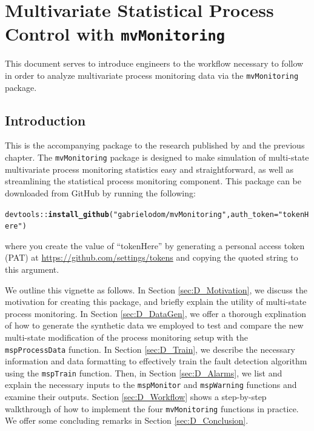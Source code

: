 \documentclass{report}\usepackage[]{graphicx}\usepackage[]{color}
\makeatletter
\newcommand{\hlstr}[1]{\textcolor[rgb]{0.192,0.494,0.8}{#1}}%
\newcommand{\hlopt}[1]{\textcolor[rgb]{0,0,0}{#1}}%
\newcommand{\hlstd}[1]{\textcolor[rgb]{0.345,0.345,0.345}{#1}}%
\newcommand{\hlkwc}[1]{\textcolor[rgb]{0.333,0.667,0.333}{#1}}%
\newcommand{\hlkwd}[1]{\textcolor[rgb]{0.737,0.353,0.396}{\textbf{#1}}}%
\newenvironment{kframe}{%
 \def\at@end@of@kframe{}%
 \ifinner\ifhmode%
  \def\at@end@of@kframe{\end{minipage}}%
  \begin{minipage}{\columnwidth}%
 \fi\fi%
 \def\FrameCommand##1{\hskip\@totalleftmargin \hskip-\fboxsep
 \colorbox{shadecolor}{##1}\hskip-\fboxsep
     \hskip-\linewidth \hskip-\@totalleftmargin \hskip\columnwidth}%
 \MakeFramed {\advance\hsize-\width
   \@totalleftmargin\z@ \linewidth\hsize
   \@setminipage}}%
 {\par\unskip\endMakeFramed%
 \at@end@of@kframe}
\newenvironment{knitrout}{}{} %
\makeatother
\begin{document}
\chapter{Multivariate Statistical Process Control with \texttt{mvMonitoring}}

This document serves to introduce engineers to the workflow necessary to follow in order to analyze multivariate process monitoring data via the \texttt{mvMonitoring} package.



\section{Introduction} \label{sec:intro}

This is the accompanying package to the research published by \cite{kazor_comparison_2016} and the previous chapter. The \texttt{mvMonitoring} package is designed to make simulation of multi-state multivariate process monitoring statistics easy and straightforward, as well as streamlining the statistical process monitoring component. This package can be downloaded from GitHub by running the following:
\begin{knitrout}
\color{fgcolor}\begin{kframe}
\begin{alltt}
 \hlstd{devtools}\hlopt{::}\hlkwd{install_github}\hlstd{(}\hlstr{"gabrielodom/mvMonitoring"}\hlstd{,} \hlkwc{auth_token} \hlstd{=} \hlstr{"tokenHere"}\hlstd{)}
\end{alltt}
\end{kframe}
\end{knitrout}
\noindent where you create the value of ``tokenHere'' by generating a personal access token (PAT) at \url{https://github.com/settings/tokens} and copying the quoted string to this argument.


We outline this vignette as follows. In Section \ref{sec:D_Motivation}, we discuss the motivation for creating this package, and briefly explain the utility of multi-state process monitoring. In Section \ref{sec:D_DataGen}, we offer a thorough explination of how to generate the synthetic data we employed to test and compare the new multi-state modification of the process monitoring setup with the \texttt{mspProcessData} function. In Section \ref{sec:D_Train}, we describe the necessary information and data formatting to effectively train the fault detection algorithm using the \texttt{mspTrain} function. Then, in Section \ref{sec:D_Alarms}, we list and explain the necessary inputs to the \texttt{mspMonitor} and \texttt{mspWarning} functions and examine their outputs. Section \ref{sec:D_Workflow} shows a step-by-step walkthrough of how to implement the four \texttt{mvMonitoring} functions in practice. We offer some concluding remarks in Section \ref{sec:D_Conclusion}.
\end{document}
